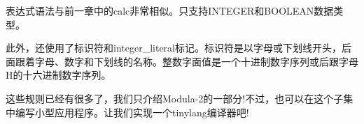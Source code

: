 表达式语法与前一章中的calc非常相似。只支持INTEGER和BOOLEAN数据类型。

此外，还使用了标识符和integer\_literal标记。标识符是以字母或下划线开头，后面跟着字母、数字和下划线的名称。整数字面值是一个十进制数字序列或后跟字母H的十六进制数字序列。

这些规则已经有很多了，我们只介绍Modula-2的一部分!不过，也可以在这个子集中编写小型应用程序。让我们实现一个tinylang编译器吧!

























